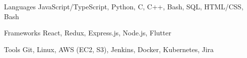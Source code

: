 

\begin{cvskills}

  \cvskill
    {Languages} %
    {JavaScript/TypeScript, Python, C, C++, Bash, SQL, HTML/CSS, Bash} %

  \cvskill
    {Frameworks} %
    {React, Redux, Express.js, Node.js, Flutter} %

  \cvskill
    {Tools} %
    {Git, Linux, AWS (EC2, S3), Jenkins, Docker, Kubernetes, Jira} %

\end{cvskills}
